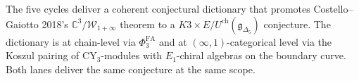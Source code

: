 \documentclass[11pt]{article}
\providecommand{\Eone}{E_1}
\providecommand{\C}{\mathbb{C}}
\providecommand{\cW}{\mathcal{W}}
\providecommand{\fg}{\mathfrak{g}}
\begin{document}
The five cycles deliver a coherent conjectural dictionary that promotes
Costello--Gaiotto 2018's $\C^3/\cW_{1+\infty}$ theorem to a
$K3\times E/U^{\mathrm{ch}}(\fg_{\Delta_5})$ conjecture. The dictionary
is at chain-level via $\Phi^{\mathrm{FA}}_3$ and at
$(\infty,1)$-categorical level via the Koszul pairing of CY$_3$-modules
with $\Eone$-chiral algebras on the boundary curve. Both lanes deliver
the same conjecture at the same scope.
\end{document}
